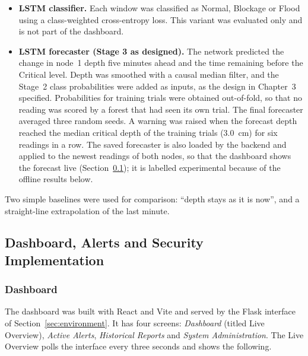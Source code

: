 \documentclass[12pt, a4paper]{article}
\begin{document}
\begin{itemize}
\item \textbf{LSTM classifier.} Each window was classified as Normal, Blockage or Flood using a class-weighted cross-entropy loss. This variant was evaluated only and is not part of the dashboard.
\item \textbf{LSTM forecaster (Stage 3 as designed).} The network predicted the change in node~1 depth five minutes ahead and the time remaining before the Critical level. Depth was smoothed with a causal median filter, and the Stage~2 class probabilities were added as inputs, as the design in Chapter~3 specified. Probabilities for training trials were obtained out-of-fold, so that no reading was scored by a forest that had seen its own trial. The final forecaster averaged three random seeds. A warning was raised when the forecast depth reached the median critical depth of the training trials (3.0~cm) for six readings in a row. The saved forecaster is also loaded by the backend and applied to the newest readings of both nodes, so that the dashboard shows the forecast live (Section~\ref{sec:dashboard}); it is labelled experimental because of the offline results below.
\end{itemize}

Two simple baselines were used for comparison: ``depth stays as it is now'', and a straight-line extrapolation of the last minute.

\subsection{Dashboard, Alerts and Security Implementation}
\label{sec:dashboard}

\subsubsection{Dashboard}

The dashboard was built with React and Vite and served by the Flask interface of Section~\ref{sec:environment}. It has four screens: \emph{Dashboard} (titled Live Overview), \emph{Active Alerts}, \emph{Historical Reports} and \emph{System Administration}. The Live Overview polls the interface every three seconds and shows the following.
\end{document}
